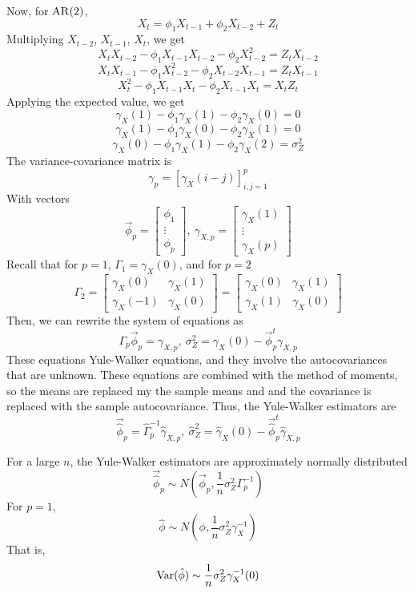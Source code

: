 Now, for $\operatorname{AR}(2)$, 
\[X_t = \phi_1 X_{t-1} + \phi_2 X_{t-2} + Z_t\]
Multiplying $X_{t-2}$, $X_{t-1}$, $X_t$, we get 
\[X_tX_{t-2} - \phi_1 X_{t-1}X_{t-2} - \phi_2 X_{t-2}^2 = Z_tX_{t-2}\]
\[X_tX_{t-1} - \phi_1 X_{t-2}^2 - \phi_2X_{t-2}X_{t-1} = Z_tX_{t-1}\]
\[X_t^2 - \phi_1X_{t-1}X_t - \phi_2X_{t-1}X_t = X_tZ_t\]
Applying the expected value, we get
\[\gamma_X(1) - \phi_1\gamma_X(1) - \phi_2\gamma_X(0) = 0\]
\[\gamma_X(1) - \phi_1\gamma_X(0) - \phi_2\gamma_X(1) = 0\]
\[\gamma_X(0) - \phi_1\gamma_X(1) - \phi_2\gamma_X(2) = \sigma_Z^2\]
The variance-covariance matrix is 
\[\gamma_p = [\gamma_X(i-j)]^p_{i,j=1}\]
With vectors 
\[\vec{\phi}_p = \begin{bmatrix}
    \phi_1 \\ \vdots \\ \phi_p
\end{bmatrix}, \ \gamma_{X,p} = \begin{bmatrix}
    \gamma_X(1) \\ \vdots \\ \gamma_X(p)
\end{bmatrix}\]
Recall that for $p=1$, $\Gamma_1 = \gamma_X(0)$, and for $p=2$ 
\[\Gamma_2 = \begin{bmatrix}
    \gamma_X(0) & \gamma_X(1) \\
    \gamma_X(-1) & \gamma_X(0)
\end{bmatrix} = \begin{bmatrix}
    \gamma_X(0) & \gamma_X(1) \\
    \gamma_X(1) & \gamma_X(0)
\end{bmatrix}\]
Then, we can rewrite the system of equations as                            
\[\Gamma_p\vec{\phi}_p = \gamma_{X,p}, \ \sigma_Z^2 = \gamma_X(0) - \vec{\phi}^t_p \gamma_{X,p}\]
These equations Yule-Walker equations, and they involve the autocovariances that are unknown. These equations are combined with the method of moments, so the means are replaced my the sample means and and the covariance is replaced with the sample autocovariance. Thus, the Yule-Walker estimators are 
\[\vec{\hat{\phi}}_p = \hat{\Gamma}_p^{-1}\hat{\gamma}_{X,p}, \ \hat{\sigma}_Z^2 = \hat{\gamma}_X(0) - \vec{\hat{\phi}}^t_p \hat{\gamma}_{X,p}\]


\begin{theorem}
    For a large $n$, the Yule-Walker estimators are approximately normally distributed 
    \[\vec{\hat{\phi}}_p \sim N\left(\vec{\phi}_p, \frac{1}{n}\sigma_Z^2\Gamma_p^{-1}\right)\]
    For $p=1$, 
    \[\hat{\phi} \sim N\left(\phi, \frac{1}{n}\sigma_Z^2\gamma_X^{-1}\right)\]
    That is, 
    \[\operatorname{Var}(\hat{\phi}) \sim \frac{1}{n}\sigma_Z^2 \gamma_X^{-1}(0)\]
\end{theorem}

